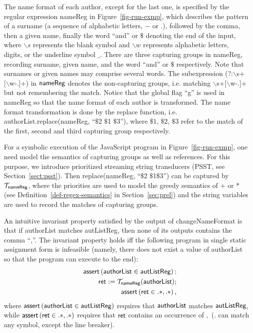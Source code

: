 The name format of each author, except for the last one, is specified by the regular expression {\sf nameReg}  in Figure~\ref{fig-run-exmp}, which describes the pattern of a surname (a sequence of alphabetic letters, $-$ or $.$), followed by the comma, then a given name, finally the word ``and'' or $\$$ denoting the end of the input, where $\backslash s$ represents the blank symbol and $\backslash w$ represents alphabetic letters, digits, or the underline symbol $\_$. There are three capturing groups in {\sf nameReg}, recording surname, given name, and the word ``and'' or $\$$ respectively. Note that surnames or given names may comprise several words. The subexpression (?:$\backslash$s+$[\backslash$w-.]+) in ${\sf nameReg}$ denotes the non-capturing groups, i.e. matching $\backslash$s+$[\backslash$w-.]+ but not remembering the match.
%
Notice that the global flag ``g'' is used in {\sf nameReg} so that the name format of each author is transformed. The name format transformation is done by the {\sf replace} function, i.e. {\sf authorList.replace(nameReg, ``$\$$2 $\$$1 $\$$3'')}, where $\$1$, $\$2$, $\$3$ refer to the match of the first, second and third capturing group respectively. 

For a symbolic execution of the JavaScript program in Figure~\ref{fig-run-exmp}, one need model the semantics of capturing groups as well as references. For this purpose, we introduce prioritized streaming string transducers (PSST, see Section~\ref{sect:psst}). Then {\sf replace(nameReg, ``$\$$2 $\$$1$\$$3'')} can be captured by $\mathcal{T}_{\sf nameReg}$, where the priorities are used to model the greedy semantics of $+$ or $*$ (see Definition~\ref{def-regex-semantics} in Section~\ref{sec:prel}) and the string variables are used to record the matches of capturing groups.

An intuitive invariant property satisfied by the output of {\sf changeNameFormat} is that if {\sf authorList} matches {\sf autListReg}, then none of its outputs contains the comma ``,''. The invariant property holds iff the following program in single static assignment form is infeasible (namely, there does not exist a value of {\sf authorList} so that the program can execute to the end):
%
\begin{eqnarray}\label{eqn:exmp}
& & \textsf{assert}\left(\sf authorList \in autListReg\right);\nonumber \\
& & \sf ret  := \sf  \mathcal{T}_{nameReg}(authorList);\nonumber \\
& &  \textsf{assert}\left(\sf ret \in .*,.*\right),
\end{eqnarray}
%
where $\textsf{assert}\left(\sf authorList \in autListReg\right)$ requires that $\sf authorList$ matches $\sf autListReg$, while $\textsf{assert}\left(\sf ret \in .*,.*\right)$ requires that $\sf ret$ contains an occurrence of $,$ ($.$ can match any symbol, except the line breaker).

